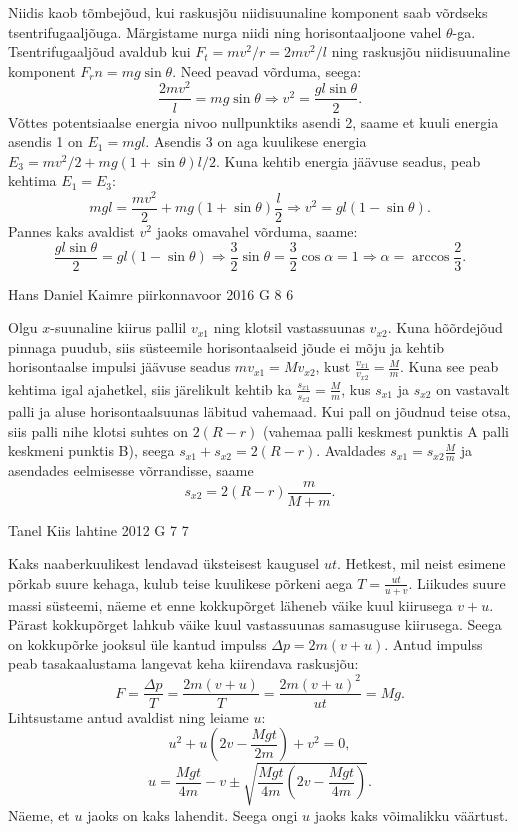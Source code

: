 \documentclass[11pt, twoside]{article}
\begin{document}
{{\ifSolution
Niidis kaob tõmbejõud, kui raskusjõu niidisuunaline komponent saab võrdseks tsentrifugaaljõuga. Märgistame nurga niidi ning horisontaaljoone vahel $\theta$-ga. Tsentrifugaaljõud avaldub kui $F_t=mv^2/r=2mv^2/l$ ning raskusjõu niidisuunaline komponent $F_rn=mg\sin\theta$. Need peavad võrduma, seega:
$$\frac{2mv^2}{l}=mg\sin\theta \Rightarrow v^2=\frac{gl\sin\theta}{2}.$$
Võttes potentsiaalse energia nivoo nullpunktiks asendi 2, saame et kuuli energia asendis 1 on $E_1=mgl$. Asendis 3 on aga kuulikese energia $E_3=mv^2/2+mg(1+\sin\theta)l/2$. Kuna kehtib energia jäävuse seadus, peab kehtima $E_1=E_3$:
$$mgl=\frac{mv^2}{2}+mg(1+\sin\theta)\frac{l}{2} \Rightarrow v^2=gl(1-\sin\theta).$$
Pannes kaks avaldist $v^2$ jaoks omavahel võrduma, saame:
$$\frac{gl\sin\theta}{2}=gl(1-\sin\theta)\Rightarrow \frac{3}{2}\sin\theta=\frac{3}{2}\cos\alpha=1 \Rightarrow \alpha=\arccos\frac{2}{3}.$$
\fi
}

{Hans Daniel Kaimre} %
{piirkonnavoor} %
{2016} %
{G 8} %
{6} %
{

\ifSolution
Olgu $x$-suunaline kiirus pallil $v_{x1}$ ning klotsil vastassuunas $v_{x2}$. Kuna hõõrdejõud pinnaga puudub, siis süsteemile horisontaalseid jõude ei mõju ja kehtib horisontaalse impulsi jäävuse seadus $mv_{x1}=Mv_{x2}$, kust $\frac{v_{x1}}{v_{x2}}=\frac{M}{m}$. Kuna see peab kehtima igal ajahetkel, siis järelikult kehtib ka $\frac{s_{x1}}{s_{x2}}=\frac{M}{m}$, kus $s_{x1}$ ja $s_{x2}$ on vastavalt palli ja aluse horisontaalsuunas läbitud vahemaad. Kui pall on jõudnud teise otsa, siis palli nihe klotsi suhtes on $2(R-r)$ (vahemaa palli keskmest punktis A palli keskmeni punktis B), seega $s_{x1}+s_{x2}=2(R-r)$. Avaldades $s_{x1} = s_{x2}\frac Mm$ ja asendades eelmisesse võrrandisse, saame 
$$s_{x2}=2(R-r)\frac{m}{M+m}.$$
\fi
}

{Tanel Kiis} %
{lahtine} %
{2012} %
{G 7} %
{7} %
{

\ifSolution
Kaks naaberkuulikest lendavad üksteisest kaugusel $u t$. Hetkest, mil neist esimene põrkab suure kehaga, kulub teise kuulikese põrkeni aega $T=\frac{u t}{u+v}$.
Liikudes suure massi süsteemi, näeme et enne kokkupõrget läheneb väike kuul kiirusega $v + u$. Pärast kokkupõrget lahkub väike kuul vastassuunas samasuguse kiirusega. Seega on kokkupõrke jooksul üle kantud impulss $\Delta p = 2m(v + u)$. Antud impulss peab tasakaalustama langevat keha kiirendava raskusjõu: \[ F=\frac{\Delta p}{T}=\frac{2m(v + u)}{T} = \frac{2m(v + u)^2}{ut}=Mg. \]
Lihtsustame antud avaldist ning leiame $u$:
\[
u^2 + u\left( 2v - \frac{Mgt}{2m}\right) + v^2 = 0,
\]
\[
u = \frac{Mgt}{4m} - v \pm \sqrt{\frac{Mgt}{4m}\left( 2v - \frac{Mgt}{4m}\right)}.
\]
Näeme, et $u$ jaoks on kaks lahendit. Seega ongi $u$ jaoks kaks võimalikku väärtust.
\fi
}

}
\end{document}
